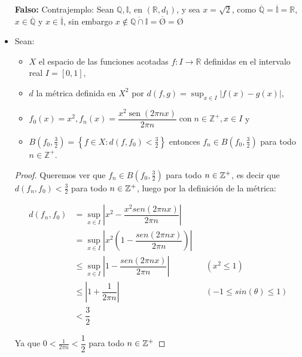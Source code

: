 \begin{itemize}[leftmargin=*]
    \textbf{Falso: }Contrajemplo: Sean $\mathbb{Q}, \mathbb{I}$, en $(\mathbb{R},d_1)$, y sea $x=\sqrt{2}$, como $\overline{\mathbb{Q}}=\overline{\mathbb{I}}=\mathbb{R}$, $x \in \overline{\mathbb{Q}}$ y $x\in \overline{\mathbb{I}}$, sin embargo $x\not \in \overline{\mathbb{Q}\cap \mathbb{I}}=\overline{\text{\O}}=$\O

    
    \item Sean:
    \begin{itemize}
        
\item $X$ el espacio de las funciones acotadas $f: I \rightarrow \mathbb{R}$ definidas en el intervalo real $I=[0,1]$,

\item $d$ la métrica definida en $X^2$ por $d(f, g)=\sup _{x \in I}|f(x)-g(x)|$,

\item $f_0(x)=x^2, f_n(x)=\dfrac{x^2 \operatorname{sen}(2 \pi n x)}{2 \pi n}                       
    \operatorname{con} n \in \mathbb{Z}^{+}, x \in I$ y

\item $B\left(f_0, \frac{3}{2}\right)=\left\{f \in X: d\left(f, f_0\right)<\frac{3}{2}\right\}$
entonces $f_n \in B\left(f_0, \frac{3}{2}\right)$ para todo $n \in \mathbb{Z}^{+}$.\\

    \end{itemize}
   
 \begin{proof}
    Queremos ver que $f_n\in B(f_0,\frac{3}{2})$ para todo $n \in \mathbb{Z}^+$, es decir que $d(f_n,f_0)<\frac{3}{2}$ para todo $n \in \mathbb{Z}^+$, luego por la definición de la métrica:
    
    \begin{align*}
        d(f_n,f_0)&=\sup_{x \in I}\left|x^2-\dfrac{x^2sen(2\pi nx)}{2\pi n}\right|\\
        &=\sup_{x \in I}\left|x^2\left(1-\dfrac{sen(2\pi nx)}{2\pi n}\right)\right|\\
        &\leq\sup_{x \in I}\left|1-\dfrac{sen(2\pi nx)}{2\pi n}\right| && (x^2\leq 1)\\
        &\leq\left|1+\dfrac{1}{2\pi n}\right|&&(-1\leq sin(\theta)\leq 1)\\
        &< \dfrac{3}{2}
     \end{align*}

Ya que $0<\frac{1}{2\pi n}< \dfrac{1}{2}$ para todo $n \in \mathbb{Z}^+$

    
\end{proof}  
   

\end{itemize}

